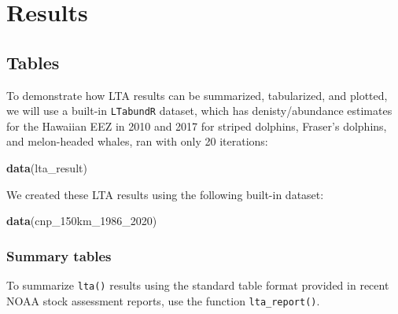 \documentclass[
]{book}
\newenvironment{Shaded}{\begin{snugshade}}{\end{snugshade}}
\newcommand{\AttributeTok}[1]{\textcolor[rgb]{0.13,0.29,0.53}{#1}}
\newcommand{\ConstantTok}[1]{\textcolor[rgb]{0.56,0.35,0.01}{#1}}
\newcommand{\ControlFlowTok}[1]{\textcolor[rgb]{0.13,0.29,0.53}{\textbf{#1}}}
\newcommand{\FunctionTok}[1]{\textcolor[rgb]{0.13,0.29,0.53}{\textbf{#1}}}
\newcommand{\NormalTok}[1]{#1}
\newcommand{\OtherTok}[1]{\textcolor[rgb]{0.56,0.35,0.01}{#1}}
\newcommand{\SpecialCharTok}[1]{\textcolor[rgb]{0.81,0.36,0.00}{\textbf{#1}}}
\begin{document}
\hypertarget{part-results}{%
\part{Results}\label{part-results}}

\hypertarget{tables}{%
\chapter{Tables}\label{tables}}

To demonstrate how LTA results can be summarized, tabularized, and plotted, we will use a built-in \texttt{LTabundR} dataset, which has denisty/abundance estimates for the Hawaiian EEZ in 2010 and 2017 for striped dolphins, Fraser's dolphins, and melon-headed whales, ran with only 20 iterations:

\begin{Shaded}
\begin{Highlighting}[]
\FunctionTok{data}\NormalTok{(lta\_result)}
\end{Highlighting}
\end{Shaded}

We created these LTA results using the following built-in dataset:

\begin{Shaded}
\begin{Highlighting}[]
\FunctionTok{data}\NormalTok{(cnp\_150km\_1986\_2020)}
\end{Highlighting}
\end{Shaded}

\hypertarget{summary-tables}{%
\section*{Summary tables}\label{summary-tables}}

To summarize \texttt{lta()} results using the standard table format provided in recent NOAA stock assessment reports, use the function \texttt{lta\_report()}.

\begin{Shaded}
\end{Shaded}
\end{document}
